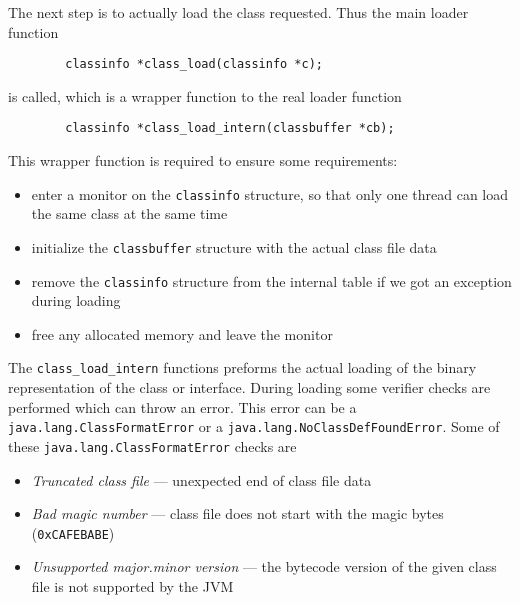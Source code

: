 The next step is to actually load the class requested. Thus the main
loader function

\begin{verbatim}
        classinfo *class_load(classinfo *c);
\end{verbatim}

is called, which is a wrapper function to the real loader function

\begin{verbatim}
        classinfo *class_load_intern(classbuffer *cb);
\end{verbatim}

This wrapper function is required to ensure some requirements:

\begin{itemize}
 \item enter a monitor on the \texttt{classinfo} structure, so that
 only one thread can load the same class at the same time

 \item initialize the \texttt{classbuffer} structure with the actual
 class file data

 \item remove the \texttt{classinfo} structure from the internal table
 if we got an exception during loading

 \item free any allocated memory and leave the monitor
\end{itemize}

The \texttt{class\_load\_intern} functions preforms the actual loading
of the binary representation of the class or interface. During loading
some verifier checks are performed which can throw an error. This
error can be a \texttt{java.lang.ClassFormatError} or a
\texttt{java.lang.NoClassDefFoundError}. Some of these
\texttt{java.lang.ClassFormatError} checks are

\begin{itemize}
 \item \textit{Truncated class file} --- unexpected end of class file
 data

 \item \textit{Bad magic number} --- class file does not start with
 the magic bytes (\texttt{0xCAFEBABE})

 \item \textit{Unsupported major.minor version} --- the bytecode
 version of the given class file is not supported by the JVM
\end{itemize}

